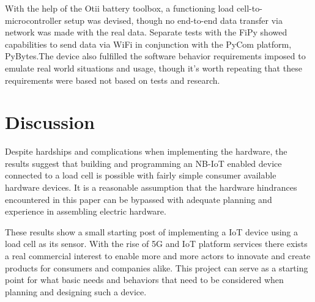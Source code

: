 \iffalse
\begin{itemize}
	\item Don’t make the reader do all the work
	\item Have a hypothesis, test them, state result clearly
	\item Two lists are not a comparison
	\item Be the first to criticize your own work
\end{itemize}
\fi

With the help of the Otii battery toolbox, a functioning load cell-to-microcontroller setup was devised, though no end-to-end data transfer via network was made with the real data. Separate tests with the FiPy showed capabilities to send data via WiFi in conjunction with the PyCom platform, PyBytes.The device also fulfilled the software behavior requirements imposed to emulate real world situations and usage, though it's worth repeating that these requirements were based not based on tests and research.

\section{Discussion}
Despite hardships and complications when implementing the hardware, the results suggest that building and programming an NB-IoT enabled device connected to a load cell is possible with fairly simple consumer available hardware devices. It is a reasonable assumption that the hardware hindrances encountered in this paper can be bypassed with adequate planning and experience in assembling electric hardware.

These results show a small starting post of implementing a IoT device using a load cell as its sensor. With the rise of 5G and IoT platform services there exists a real commercial interest to enable more and more actors to innovate and create products for consumers and companies alike. This project can serve as a starting point for what basic needs and behaviors that need to be considered when planning and designing such a device.	

